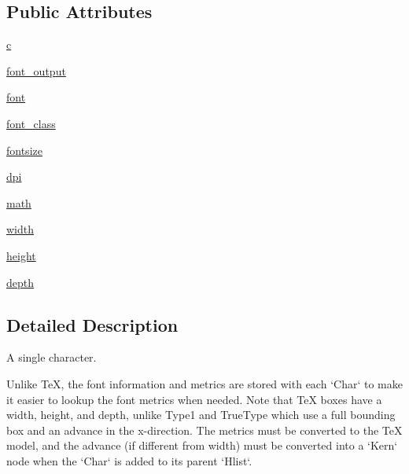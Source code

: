 \subsection*{Public Attributes}
\begin{DoxyCompactItemize}
\item 
\hyperlink{classmatplotlib_1_1__mathtext_1_1Char_ad0a96d779582655d1806dbfdee8756ae}{c}
\item 
\hyperlink{classmatplotlib_1_1__mathtext_1_1Char_ad0517db302116292c8a6f1d0fcd646e5}{font\+\_\+output}
\item 
\hyperlink{classmatplotlib_1_1__mathtext_1_1Char_a9d73241b9a249cebec1b8c5879b73ff7}{font}
\item 
\hyperlink{classmatplotlib_1_1__mathtext_1_1Char_a28bc459ec7d140347fa00f39d95a0bc6}{font\+\_\+class}
\item 
\hyperlink{classmatplotlib_1_1__mathtext_1_1Char_a0a46ba1f757218207860526a884adcbb}{fontsize}
\item 
\hyperlink{classmatplotlib_1_1__mathtext_1_1Char_a5791b11c90b1ea91dd63eb488f9382a4}{dpi}
\item 
\hyperlink{classmatplotlib_1_1__mathtext_1_1Char_ac128837857ae5dbf517edcf098bba4d4}{math}
\item 
\hyperlink{classmatplotlib_1_1__mathtext_1_1Char_a1fbd200443acd7468950756327edbd33}{width}
\item 
\hyperlink{classmatplotlib_1_1__mathtext_1_1Char_a38a8a687d465c16ac6022596ca812180}{height}
\item 
\hyperlink{classmatplotlib_1_1__mathtext_1_1Char_aba0869d79610b37fc4dcd94be653f449}{depth}
\end{DoxyCompactItemize}


\subsection{Detailed Description}
\begin{DoxyVerb}A single character.

Unlike TeX, the font information and metrics are stored with each `Char`
to make it easier to lookup the font metrics when needed.  Note that TeX
boxes have a width, height, and depth, unlike Type1 and TrueType which use
a full bounding box and an advance in the x-direction.  The metrics must
be converted to the TeX model, and the advance (if different from width)
must be converted into a `Kern` node when the `Char` is added to its parent
`Hlist`.
\end{DoxyVerb}
 


